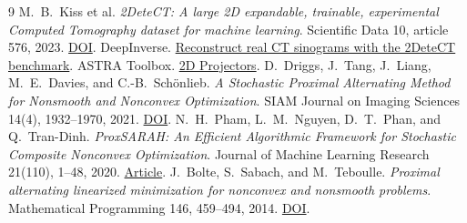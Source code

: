 \documentclass[11pt]{article}
\begin{document}

\clearpage
\begin{thebibliography}{9}
M.~B.~Kiss et al.
\emph{2DeteCT: A large 2D expandable, trainable, experimental Computed Tomography
dataset for machine learning}. Scientific Data 10, article 576, 2023.
\href{https://doi.org/10.1038/s41597-023-02484-6}{DOI}.
DeepInverse.
\href{https://deepinv.org/auto_examples/external-libraries/demo_astra_2detect.html}
{Reconstruct real CT sinograms with the 2DeteCT benchmark}.
ASTRA Toolbox. \href{https://astra-toolbox.com/docs/proj2d.html#fan-beam}{2D Projectors}.
D.~Driggs, J.~Tang, J.~Liang, M.~E.~Davies, and C.-B.~Sch\"onlieb.
\emph{A Stochastic Proximal Alternating Method for Nonsmooth and Nonconvex Optimization}.
SIAM Journal on Imaging Sciences 14(4), 1932--1970, 2021.
\href{https://doi.org/10.1137/20M1387213}{DOI}.
N.~H.~Pham, L.~M.~Nguyen, D.~T.~Phan, and Q.~Tran-Dinh.
\emph{ProxSARAH: An Efficient Algorithmic Framework for Stochastic Composite Nonconvex Optimization}.
Journal of Machine Learning Research 21(110), 1--48, 2020.
\href{https://www.jmlr.org/papers/v21/19-248.html}{Article}.
J.~Bolte, S.~Sabach, and M.~Teboulle.
\emph{Proximal alternating linearized minimization for nonconvex and nonsmooth problems}.
Mathematical Programming 146, 459--494, 2014.
\href{https://doi.org/10.1007/s10107-013-0701-9}{DOI}.
\end{thebibliography}
\end{document}
